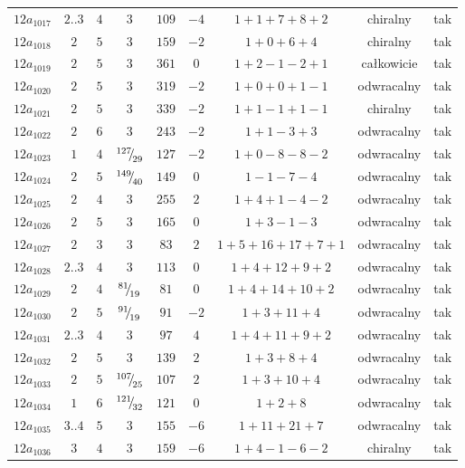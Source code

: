 \begin{longtable}{ccccccccc}
$12a_{1017}$ & $2..3$ & $4$ & $3$ & $109$ & $-4$ & $1+1+7+8+2$ & chiralny & tak \\
$12a_{1018}$ & $2$ & $5$ & $3$ & $159$ & $-2$ & $1+0+6+4$ & chiralny & tak \\
$12a_{1019}$ & $2$ & $5$ & $3$ & $361$ & $0$ & $1+2-1-2+1$ & całkowicie & tak \\
$12a_{1020}$ & $2$ & $5$ & $3$ & $319$ & $-2$ & $1+0+0+1-1$ & odwracalny & tak \\
$12a_{1021}$ & $2$ & $5$ & $3$ & $339$ & $-2$ & $1+1-1+1-1$ & chiralny & tak \\
$12a_{1022}$ & $2$ & $6$ & $3$ & $243$ & $-2$ & $1+1-3+3$ & odwracalny & tak \\
$12a_{1023}$ & $1$ & $4$ & ${}^{127}{\mskip -5mu/\mskip -3mu}_{29}$ & $127$ & $-2$ & $1+0-8-8-2$ & odwracalny & tak \\
$12a_{1024}$ & $2$ & $5$ & ${}^{149}{\mskip -5mu/\mskip -3mu}_{40}$ & $149$ & $0$ & $1-1-7-4$ & odwracalny & tak \\
$12a_{1025}$ & $2$ & $4$ & $3$ & $255$ & $2$ & $1+4+1-4-2$ & odwracalny & tak \\
$12a_{1026}$ & $2$ & $5$ & $3$ & $165$ & $0$ & $1+3-1-3$ & odwracalny & tak \\
$12a_{1027}$ & $2$ & $3$ & $3$ & $83$ & $2$ & $1+5+16+17+7+1$ & odwracalny & tak \\
$12a_{1028}$ & $2..3$ & $4$ & $3$ & $113$ & $0$ & $1+4+12+9+2$ & odwracalny & tak \\
$12a_{1029}$ & $2$ & $4$ & ${}^{81}{\mskip -5mu/\mskip -3mu}_{19}$ & $81$ & $0$ & $1+4+14+10+2$ & odwracalny & tak \\
$12a_{1030}$ & $2$ & $5$ & ${}^{91}{\mskip -5mu/\mskip -3mu}_{19}$ & $91$ & $-2$ & $1+3+11+4$ & odwracalny & tak \\
$12a_{1031}$ & $2..3$ & $4$ & $3$ & $97$ & $4$ & $1+4+11+9+2$ & odwracalny & tak \\
$12a_{1032}$ & $2$ & $5$ & $3$ & $139$ & $2$ & $1+3+8+4$ & odwracalny & tak \\
$12a_{1033}$ & $2$ & $5$ & ${}^{107}{\mskip -5mu/\mskip -3mu}_{25}$ & $107$ & $2$ & $1+3+10+4$ & odwracalny & tak \\
$12a_{1034}$ & $1$ & $6$ & ${}^{121}{\mskip -5mu/\mskip -3mu}_{32}$ & $121$ & $0$ & $1+2+8$ & odwracalny & tak \\
$12a_{1035}$ & $3..4$ & $5$ & $3$ & $155$ & $-6$ & $1+11+21+7$ & odwracalny & tak \\
$12a_{1036}$ & $3$ & $4$ & $3$ & $159$ & $-6$ & $1+4-1-6-2$ & chiralny & tak \\

\end{longtable}
